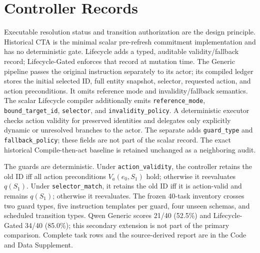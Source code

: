 \documentclass[10pt]{article}
\begin{document}
\section{Controller Records}
Executable resolution status and transition authorization are the design principle. Historical CTA is the minimal scalar
pre-refresh commitment implementation and has no deterministic gate. Lifecycle adds a typed,
auditable validity/fallback record; Lifecycle-Gated enforces that record at mutation time.
The Generic pipeline passes the original instruction separately to its actor; its compiled
ledger stores the initial selected ID, full entity snapshot, selector, requested action, and
action preconditions. It omits
reference mode and invalidity/fallback semantics. The scalar Lifecycle compiler additionally
emits \texttt{reference\_mode}, \texttt{bound\_target\_id}, \texttt{selector}, and
\texttt{invalidity\_policy}. A deterministic executor checks action validity for preserved
identities and delegates only explicitly dynamic or unresolved branches to the actor. The
separate \GuardedExtension{} adds \texttt{guard\_type} and
\texttt{fallback\_policy}; these fields are not part of the scalar \PrimaryDiagnostic{} record. The exact
historical Compile-then-act baseline is retained unchanged as a neighboring audit.

The \GuardedExtension{} guards are deterministic. Under \texttt{action\_validity}, the controller retains the
old ID iff all action preconditions $V_a(e_0,S_1)$ hold; otherwise it reevaluates $q(S_1)$.
Under \texttt{selector\_match}, it retains the old ID iff it is action-valid and remains
$q(S_1)$; otherwise it reevaluates. The frozen 40-task inventory crosses two guard types, five
instruction templates per guard, four unseen schemas, and scheduled transition types. Qwen Generic
scores 21/40 (52.5\%) and Lifecycle-Gated 34/40 (85.0\%); this secondary extension is not part of
the primary comparison. Complete task rows and the source-derived report are in the Code and Data Supplement.
\end{document}
